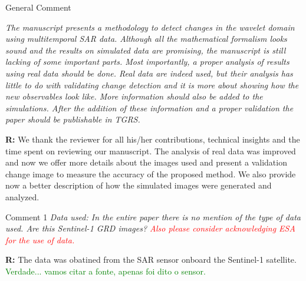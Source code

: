 \documentclass[11pt]{report}
\begin{document}
\begin{mybox}{General Comment}

\textit{The manuscript presents a methodology to detect changes in the wavelet domain using multitemporal SAR
data. Although all the mathematical formalism looks sound and the results on simulated data are promising,
the manuscript is still lacking of some important parts. Most importantly, a proper analysis of results using
real data should be done. Real data are indeed used, but their analysis has little to do with validating change
detection and it is more about showing how the new observables look like. More information should also be
added to the simulations. After the addition of these information and a proper validation the paper should be
publishable in TGRS.}
\medskip

\textbf{R:} We thank the reviewer for all his/her contributions, technical insights and the time
spent on reviewing our manuscript. The analysis of real data was improved and now we offer more details about the images used and present a validation change image to measure the accuracy of the proposed method. We also provide now a better description of how the simulated images were generated and analyzed.
\end{mybox}

\medskip
\begin{mybox}{Comment 1}
\textit{Data used: In the entire paper there is no mention of the type of data used. Are this Sentinel-1 GRD images?
\textcolor{red}{Also please consider acknowledging ESA for the use of data.}}


\medskip
\textbf{R:} The data was obatined from the SAR sensor onboard the Sentinel-1 satellite.
\textcolor{green}{Verdade... vamos citar a fonte, apenas foi dito o sensor.}
\end{mybox}
\end{document}
